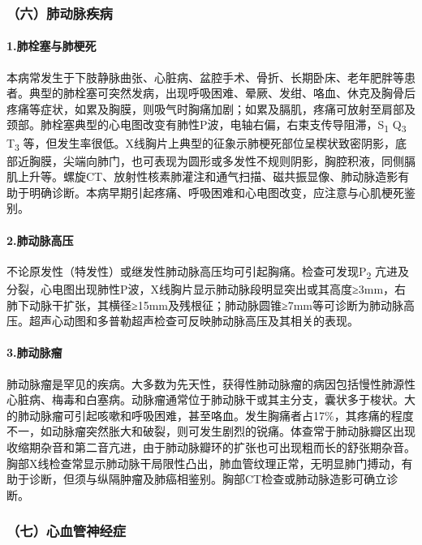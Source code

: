 \subsubsection{（六）肺动脉疾病}

\paragraph{1.肺栓塞与肺梗死}

本病常发生于下肢静脉曲张、心脏病、盆腔手术、骨折、长期卧床、老年肥胖等患者。典型的肺栓塞可突然发病，出现呼吸困难、晕厥、发绀、咯血、休克及胸骨后疼痛等症状，如累及胸膜，则吸气时胸痛加剧；如累及膈肌，疼痛可放射至肩部及颈部。肺栓塞典型的心电图改变有肺性P波，电轴右偏，右束支传导阻滞，S\textsubscript{1}
Q\textsubscript{3} T\textsubscript{3}
等，但发生率很低。X线胸片上典型的征象示肺梗死部位呈楔状致密阴影，底部近胸膜，尖端向肺门，也可表现为圆形或多发性不规则阴影，胸腔积液，同侧膈肌上升等。螺旋CT、放射性核素肺灌注和通气扫描、磁共振显像、肺动脉造影有助于明确诊断。本病早期引起疼痛、呼吸困难和心电图改变，应注意与心肌梗死鉴别。

\paragraph{2.肺动脉高压}

不论原发性（特发性）或继发性肺动脉高压均可引起胸痛。检查可发现P\textsubscript{2}
亢进及分裂，心电图出现肺性P波，X线胸片显示肺动脉段明显突出或其高度≥3mm，右肺下动脉干扩张，其横径≥15mm及残根征；肺动脉圆锥≥7mm等可诊断为肺动脉高压。超声心动图和多普勒超声检查可反映肺动脉高压及其相关的表现。

\paragraph{3.肺动脉瘤}

肺动脉瘤是罕见的疾病。大多数为先天性，获得性肺动脉瘤的病因包括慢性肺源性心脏病、梅毒和白塞病。动脉瘤通常位于肺动脉干或其主分支，囊状多于梭状。大的肺动脉瘤可引起咳嗽和呼吸困难，甚至咯血。发生胸痛者占17\%，其疼痛的程度不一，如动脉瘤突然胀大和破裂，则可发生剧烈的锐痛。体查常于肺动脉瓣区出现收缩期杂音和第二音亢进，由于肺动脉瓣环的扩张也可出现粗而长的舒张期杂音。胸部X线检查常显示肺动脉干局限性凸出，肺血管纹理正常，无明显肺门搏动，有助于诊断，但须与纵隔肿瘤及肺癌相鉴别。胸部CT检查或肺动脉造影可确立诊断。

\subsubsection{（七）心血管神经症}

